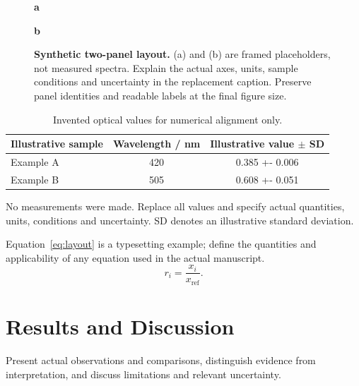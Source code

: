 \documentclass[a4paper,preprint,12pt]{elsarticle}
\begin{document}
\begin{figure}[htbp]
\centering
\begin{minipage}[t]{0.47\linewidth}
\centering\textbf{a}\par\smallskip
{}
\end{minipage}\hfill
\begin{minipage}[t]{0.47\linewidth}
\centering\textbf{b}\par\smallskip
{}
\end{minipage}
\caption{\textbf{Synthetic two-panel layout.} (a) and (b) are framed
placeholders, not measured spectra. Explain the actual axes, units, sample
conditions and uncertainty in the replacement caption. Preserve panel
identities and readable labels at the final figure size.}
\label{fig:spectra}
\end{figure}
\begin{table}[htbp]
\centering\small
\caption{Invented optical values for numerical alignment only.}
\label{tab:values}
\begin{tabularx}{\linewidth}{@{}>{\raggedright\arraybackslash}X
 S[table-format=3.0] S[table-format=1.3(3)]@{}}
\toprule
Illustrative sample & {Wavelength / nm} & {Illustrative value $\pm$ SD}\\
\midrule
Example A & 420 & 0.385 +- 0.006\\
Example B & 505 & 0.608 +- 0.051\\
\bottomrule
\end{tabularx}
\par\smallskip\footnotesize\raggedright
No measurements were made. Replace all values and specify actual quantities,
units, conditions and uncertainty. SD denotes an illustrative standard deviation.
\end{table}

Equation~\eqref{eq:layout} is a typesetting example; define the quantities
and applicability of any equation used in the actual manuscript.
\begin{equation}
 r_i = \frac{x_i}{x_{\mathrm{ref}}}.\label{eq:layout}
\end{equation}

\section{Results and Discussion}\label{sec:results}
Present actual observations and comparisons, distinguish evidence from
interpretation, and discuss limitations and relevant uncertainty.
\end{document}
